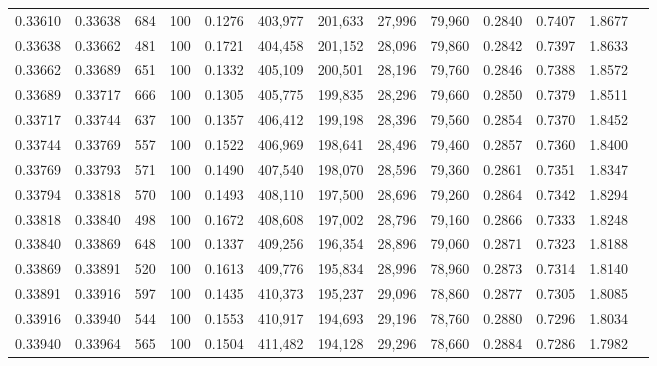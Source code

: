 \begin{tabular}{rrrrrrrrrrrrr}
0.33610 & 0.33638 &    684 & 100 &                                     0.1276 & 403,977 & 201,633 &  27,996 &  79,960 & 0.2840 & 0.7407 & 1.8677 \\
0.33638 & 0.33662 &    481 & 100 &                                     0.1721 & 404,458 & 201,152 &  28,096 &  79,860 & 0.2842 & 0.7397 & 1.8633 \\
0.33662 & 0.33689 &    651 & 100 &                                     0.1332 & 405,109 & 200,501 &  28,196 &  79,760 & 0.2846 & 0.7388 & 1.8572 \\
0.33689 & 0.33717 &    666 & 100 &                                     0.1305 & 405,775 & 199,835 &  28,296 &  79,660 & 0.2850 & 0.7379 & 1.8511 \\
0.33717 & 0.33744 &    637 & 100 &                                     0.1357 & 406,412 & 199,198 &  28,396 &  79,560 & 0.2854 & 0.7370 & 1.8452 \\
0.33744 & 0.33769 &    557 & 100 &                                     0.1522 & 406,969 & 198,641 &  28,496 &  79,460 & 0.2857 & 0.7360 & 1.8400 \\
0.33769 & 0.33793 &    571 & 100 &                                     0.1490 & 407,540 & 198,070 &  28,596 &  79,360 & 0.2861 & 0.7351 & 1.8347 \\
0.33794 & 0.33818 &    570 & 100 &                                     0.1493 & 408,110 & 197,500 &  28,696 &  79,260 & 0.2864 & 0.7342 & 1.8294 \\
0.33818 & 0.33840 &    498 & 100 &                                     0.1672 & 408,608 & 197,002 &  28,796 &  79,160 & 0.2866 & 0.7333 & 1.8248 \\
0.33840 & 0.33869 &    648 & 100 &                                     0.1337 & 409,256 & 196,354 &  28,896 &  79,060 & 0.2871 & 0.7323 & 1.8188 \\
0.33869 & 0.33891 &    520 & 100 &                                     0.1613 & 409,776 & 195,834 &  28,996 &  78,960 & 0.2873 & 0.7314 & 1.8140 \\
0.33891 & 0.33916 &    597 & 100 &                                     0.1435 & 410,373 & 195,237 &  29,096 &  78,860 & 0.2877 & 0.7305 & 1.8085 \\
0.33916 & 0.33940 &    544 & 100 &                                     0.1553 & 410,917 & 194,693 &  29,196 &  78,760 & 0.2880 & 0.7296 & 1.8034 \\
0.33940 & 0.33964 &    565 & 100 &                                     0.1504 & 411,482 & 194,128 &  29,296 &  78,660 & 0.2884 & 0.7286 & 1.7982 \\

\end{tabular}
